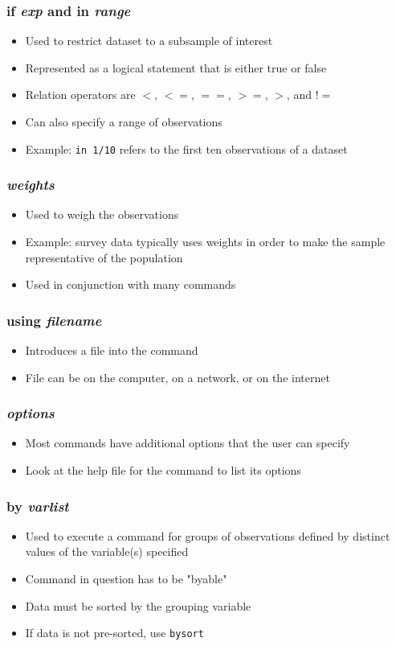 \documentclass{beamer}
\begin{document}
\begin{frame}
	\frametitle{if \textit{exp} and in \textit{range}}
		\begin{itemize}
			\item Used to restrict dataset to a subsample of interest
			\item Represented as a logical statement that is either true or false
			\item Relation operators are $<$, $<=$, $==$, $>=$, $>$, and $!=$
			\item Can also specify a range of observations
			\item Example: \texttt{in 1/10} refers to the first ten observations of a dataset
		\end{itemize}
\end{frame}

\begin{frame}
	\frametitle{\textit{weights}}
		\begin{itemize}
			\item Used to weigh the observations
			\item Example: survey data typically uses weights in order to make the sample representative of the population
			\item Used in conjunction with many commands
		\end{itemize}
\end{frame}

\begin{frame}
	\frametitle{using \textit{filename}}
		\begin{itemize}
			\item Introduces a file into the command
			\item File can be on the computer, on a network, or on the internet
		\end{itemize}
\end{frame}

\begin{frame}
	\frametitle{\textit{options}}
		\begin{itemize}
			\item Most commands have additional options that the user can specify
			\item Look at the help file for the command to list its options
		\end{itemize}
\end{frame}

\begin{frame}
	\frametitle{by \textit{varlist}}
		\begin{itemize}
			\item Used to execute a command for groups of observations defined by distinct values of the variable(s) specified
			\item Command in question has to be "byable"
			\item Data must be sorted by the grouping variable
			\item If data is not pre-sorted, use \texttt{bysort}
		\end{itemize}
\end{frame}
\end{document}
